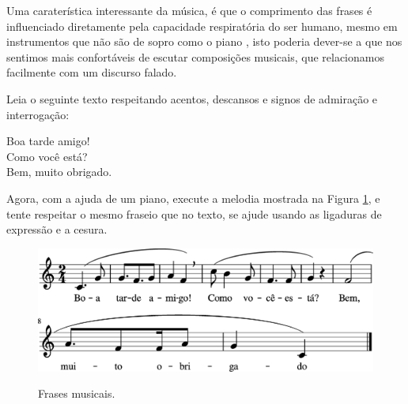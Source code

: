 Uma caraterística interessante da música, 
é que o comprimento das frases é influenciado diretamente pela capacidade respiratória do ser humano,
mesmo em instrumentos que não são de sopro como o piano \cite[pp. 48]{howard1991aprendendo},
isto poderia dever-se a que nos sentimos mais confortáveis de escutar composições musicais,
que relacionamos facilmente com um discurso falado.

\begin{example}
Leia  o seguinte texto respeitando acentos, descansos e signos de admiração e interrogação:
\begin{citando}%
Boa tarde amigo!\\
Como você está?\\
Bem, muito obrigado.
\end{citando}%

Agora, com a ajuda de um piano, execute a melodia mostrada na Figura \ref{fig:conversa1},
e tente respeitar o mesmo fraseio que no texto, se ajude usando as ligaduras de expressão e a cesura.
\end{example}

\begin{figure}[!h]
\centering
\href{https://drive.google.com/file/d/1rOD08xWn0m5R2KPRa2gf3ycU0nF7sOgV/view?usp=sharing}{\includegraphics[width=\textwidth]{chapters/cap-musica-topicos/conversa-1.eps}}
\caption{Frases musicais.}
\label{fig:conversa1}
\end{figure}



